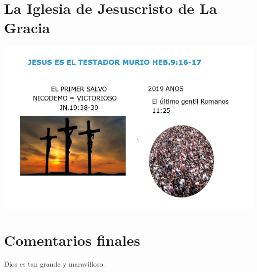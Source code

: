 \documentclass[]{book}
\begin{document}
\hypertarget{la-iglesia-de-jesuscristo-de-la-gracia}{%
\chapter{La Iglesia de Jesuscristo de La Gracia}\label{la-iglesia-de-jesuscristo-de-la-gracia}}

\includegraphics{static/iglesia_de_jesus_cristo_de_la_gracia.png}

\hypertarget{comentarios-finales}{%
\chapter{Comentarios finales}\label{comentarios-finales}}

Dios es tan grande y maravilloso.


\end{document}
